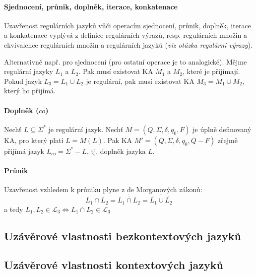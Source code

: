 \paragraph*{Sjednocení, průnik, doplněk, iterace, konkatenace} \begin{compactitem}
    \item Uzavřenost regulárních jazyků vůči operacím sjednocení, průnik, doplněk, iterace a konkatenace vyplývá z definice regulárních výrazů, resp. regulárních množin a ekvivalence regulárních množin a regulárních jazyků (\textit{viz otázka regulární výrazy}). \begin{compactitem}
        \item Alternativně např. pro sjednocení (pro ostatní operace je to analogické). Mějme regulární jazyky $L_1$ a $L_2$. Pak musí existovat KA $M_1$ a $M_2$, které je přijímají. Pokud jazyk $L_3 = L_1 \cup L_2$ je regulární, pak musí existovat KA $M_3 = M_1 \cup M_2$, který ho přijímá. %
    \end{compactitem}
\end{compactitem}

\paragraph*{Doplněk ($co$)} Nechť $L \subseteq \Sigma^*$ je regulární jazyk. Nechť $M = (Q, \Sigma, \delta, q_0, F)$ je úplně definovaný KA, pro který platí $L = M(L)$. Pak KA $M' = (Q, \Sigma, \delta, q_0, Q - F)$ zřejmě přijímá jazyk $L_{co} = \Sigma^* - L$, tj. doplněk jazyka $L$.

\paragraph*{Průnik} Uzavřenost vzhledem k průniku plyne z de Morganových zákonů: $$L_1 \cap L_2 = \overline{\overline{L_1 \cap L_2}} = \overline{\overline{L_1} \cup \overline{L_2}}$$ a tedy $L_1, L_2 \in \mathcal{L}_3 \Leftrightarrow L_1 \cap L_2 \in \mathcal{L}_3$

\subsection{Uzávěrové vlastnosti bezkontextových jazyků}


\subsection{Uzávěrové vlastnosti kontextových jazyků}

